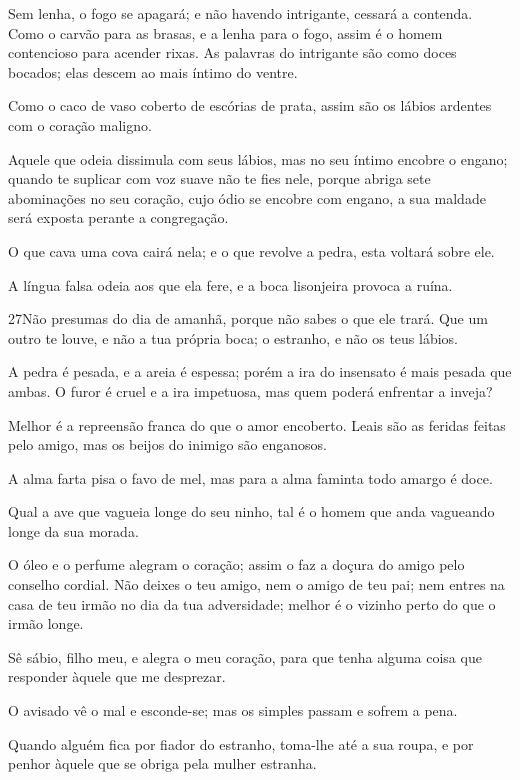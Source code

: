 Sem lenha, o fogo se apagará; e não havendo intrigante, cessará a
contenda. Como o carvão para as brasas, e a lenha para o
fogo, assim é o homem contencioso para acender rixas.
 As palavras do intrigante são como doces bocados; elas descem ao
mais íntimo do ventre.

Como o caco de vaso coberto de escórias de prata, assim são os
lábios ardentes com o coração maligno.

Aquele que odeia dissimula com seus lábios, mas no seu íntimo
encobre o engano; quando te suplicar com voz suave não te
fies nele, porque abriga sete abominações no seu coração,
cujo ódio se encobre com engano, a sua maldade será exposta
perante a congregação.

O que cava uma cova cairá nela; e o que revolve a pedra, esta
voltará sobre ele.

A língua falsa odeia aos que ela fere, e a boca lisonjeira
provoca a ruína.

\medskip

\lettrine{27}{}Não presumas do dia de amanhã, porque não sabes
o que ele trará.  Que um outro te louve, e não a tua
própria boca; o estranho, e não os teus lábios.

A pedra é pesada, e a areia é espessa; porém a ira do insensato é
mais pesada que ambas. O furor é cruel e a ira impetuosa, mas
quem poderá enfrentar a inveja?

Melhor é a repreensão franca do que o amor encoberto. Leais
são as feridas feitas pelo amigo, mas os beijos do inimigo são
enganosos.

A alma farta pisa o favo de mel, mas para a alma faminta todo
amargo é doce.

Qual a ave que vagueia longe do seu ninho, tal é o homem que anda
vagueando longe da sua morada.

O óleo e o perfume alegram o coração; assim o faz a doçura do
amigo pelo conselho cordial. Não deixes o teu amigo, nem o
amigo de teu pai; nem entres na casa de teu irmão no dia da tua
adversidade; melhor é o vizinho perto do que o irmão longe.

Sê sábio, filho meu, e alegra o meu coração, para que tenha
alguma coisa que responder àquele que me desprezar.

O avisado vê o mal e esconde-se; mas os simples passam e sofrem a
pena.

Quando alguém fica por fiador do estranho, toma-lhe até a sua
roupa, e por penhor àquele que se obriga pela mulher estranha.

